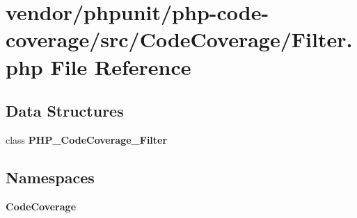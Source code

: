 \section{vendor/phpunit/php-\/code-\/coverage/src/\+Code\+Coverage/\+Filter.php File Reference}
\label{php-code-coverage_2src_2_code_coverage_2_filter_8php}
\subsection*{Data Structures}
\begin{DoxyCompactItemize}
\item 
class {\bf P\+H\+P\+\_\+\+Code\+Coverage\+\_\+\+Filter}
\end{DoxyCompactItemize}
\subsection*{Namespaces}
\begin{DoxyCompactItemize}
\item 
 {\bf Code\+Coverage}
\end{DoxyCompactItemize}
